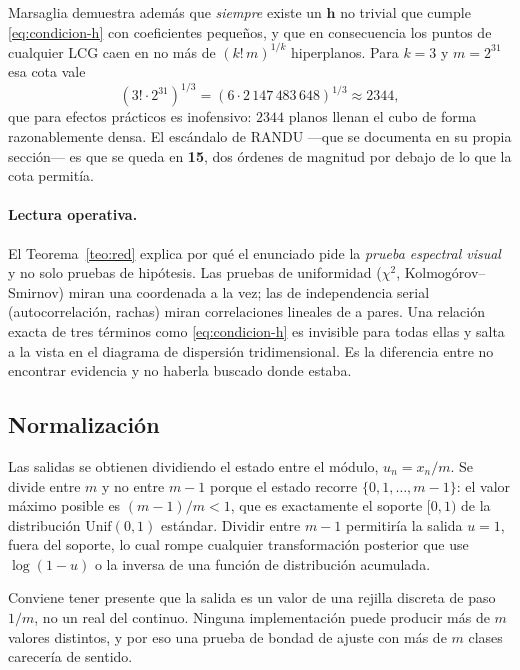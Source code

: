Marsaglia \cite{marsaglia} demuestra además que \emph{siempre} existe un
$\mathbf{h}$ no trivial que cumple \eqref{eq:condicion-h} con coeficientes
pequeños, y que en consecuencia los puntos de cualquier LCG caen en no más de
$(k!\,m)^{1/k}$ hiperplanos. Para $k=3$ y $m = 2^{31}$ esa cota vale
\[
  (3! \cdot 2^{31})^{1/3} = (6 \cdot 2\,147\,483\,648)^{1/3} \approx 2344 ,
\]
que para efectos prácticos es inofensivo: $2344$ planos llenan el cubo de forma
razonablemente densa. El escándalo de RANDU —que se documenta en su propia
sección— es que se queda en \textbf{15}, dos órdenes de magnitud por debajo de
lo que la cota permitía.

\paragraph{Lectura operativa.} El Teorema~\ref{teo:red} explica por qué el
enunciado pide la \emph{prueba espectral visual} y no solo pruebas de hipótesis.
Las pruebas de uniformidad ($\chi^2$, Kolmogórov--Smirnov) miran una coordenada
a la vez; las de independencia serial (autocorrelación, rachas) miran
correlaciones lineales de a pares. Una relación exacta de tres términos como
\eqref{eq:condicion-h} es invisible para todas ellas y salta a la vista en el
diagrama de dispersión tridimensional. Es la diferencia entre no encontrar
evidencia y no haberla buscado donde estaba.

\subsection{Normalización}

Las salidas se obtienen dividiendo el estado entre el módulo, $u_n = x_n / m$.
Se divide entre $m$ y no entre $m-1$ porque el estado recorre
$\{0, 1, \dots, m-1\}$: el valor máximo posible es $(m-1)/m < 1$, que es
exactamente el soporte $[0,1)$ de la distribución $\mathrm{Unif}(0,1)$ estándar.
Dividir entre $m-1$ permitiría la salida $u = 1$, fuera del soporte, lo cual
rompe cualquier transformación posterior que use $\log(1-u)$ o la inversa de una
función de distribución acumulada.

Conviene tener presente que la salida es un valor de una rejilla discreta de
paso $1/m$, no un real del continuo. Ninguna implementación puede producir más
de $m$ valores distintos, y por eso una prueba de bondad de ajuste con más de
$m$ clases carecería de sentido.
